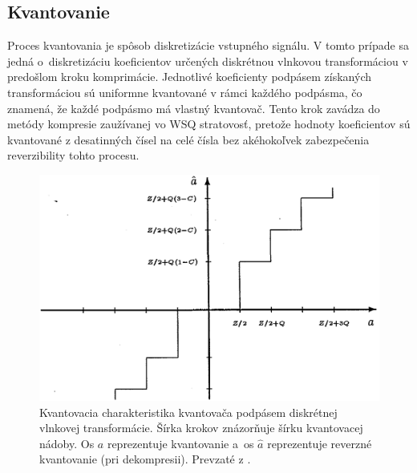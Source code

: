   \subsection{Kvantovanie}
  Proces kvantovania je spôsob diskretizácie vstupného signálu. V tomto prípade sa jedná o~diskretizáciu koeficientov určených diskrétnou vlnkovou
  transformáciou v predošlom kroku komprimácie. Jednotlivé koeficienty podpásem získaných transformáciou sú uniformne kvantované v rámci každého podpásma,
  čo znamená, že každé podpásmo má vlastný kvantovač. Tento krok zavádza do metódy kompresie zaužívanej vo WSQ stratovosť, pretože hodnoty koeficientov
  sú kvantované z desatinných čísel na celé čísla bez akéhokoľvek zabezpečenia reverzibility tohto procesu.

  \begin{figure}[h]
    \centering
    \includegraphics[width=0.6\linewidth]{obrazky-figures/wsq_kvantovacia_charakteristika.png}
    \caption{Kvantovacia charakteristika kvantovača podpásem diskrétnej vlnkovej transformácie. Šírka krokov znázorňuje šírku kvantovacej nádoby.
    Os $a$ reprezentuje kvantovanie a~os $\hat{a}$ reprezentuje reverzné kvantovanie (pri dekompresii). Prevzaté z \cite{brislawn1996compression}.}
    \label{obr:wsq_kvantovacia_charakteristika}
  \end{figure}

